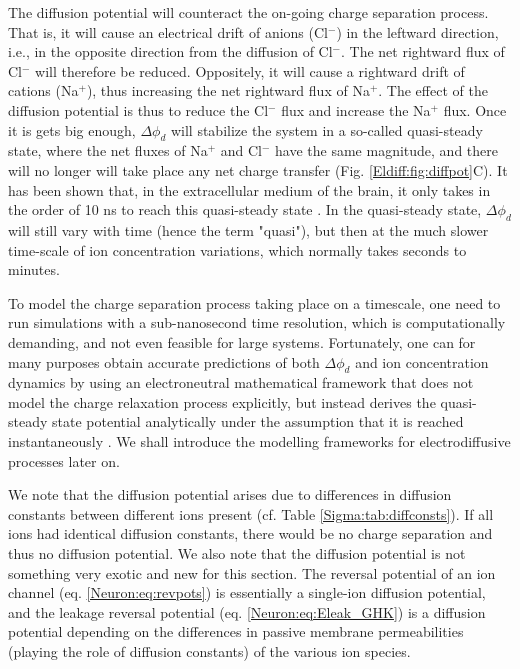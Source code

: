The diffusion potential will counteract the on-going charge separation process. That is, it will cause an electrical drift of anions (Cl$^-$) in the leftward direction, i.e., in the opposite direction from the diffusion of Cl$^-$. The net rightward flux of Cl$^-$ will therefore be reduced. Oppositely, it will cause a rightward drift of cations (Na$^+$), thus increasing the net rightward flux of Na$^+$. The effect of the diffusion potential is thus to reduce the Cl$^-$ flux and increase the Na$^+$ flux. Once it is gets big enough, $\Delta \phi_d$ will stabilize the system in a so-called quasi-steady state, where the net fluxes of Na$^+$ and Cl$^-$ have the same magnitude, and there will no longer will take place any net charge transfer (Fig. \ref{Eldiff:fig:diffpot}C). It has been shown that, in the extracellular medium of the brain, it only takes in the order of 10 ns to reach this quasi-steady state \cite{Solbra2018}. In the quasi-steady state, $\Delta \phi_d$ will still vary with time (hence the term "quasi"), but then at the much slower time-scale of ion concentration variations, which normally takes seconds to minutes.

To model the charge separation process taking place on a timescale, one need to run simulations with a sub-nanosecond time resolution, which is computationally demanding, and not even feasible for large systems. Fortunately, one can for many purposes obtain accurate predictions of both $\Delta \phi_d$ and ion concentration dynamics by using an electroneutral mathematical framework that does not model the charge relaxation process explicitly, but instead derives the quasi-steady state potential analytically under the assumption that it is reached instantaneously \cite{Solbra2018}. We shall introduce the modelling frameworks for electrodiffusive processes later on.

We note that the diffusion potential arises due to differences in diffusion constants between different ions present  (cf. Table \ref{Sigma:tab:diffconsts}). If all ions had identical diffusion constants, there would be no charge separation and thus no diffusion potential. We also note that the diffusion potential is not something very exotic and new for this section. The reversal potential of an ion channel (eq. \ref{Neuron:eq:revpots}) is essentially a single-ion diffusion potential, and the leakage reversal potential (eq. \ref{Neuron:eq:Eleak_GHK}) is a diffusion potential depending on the differences in passive membrane permeabilities (playing the role of diffusion constants) of the various ion species.


